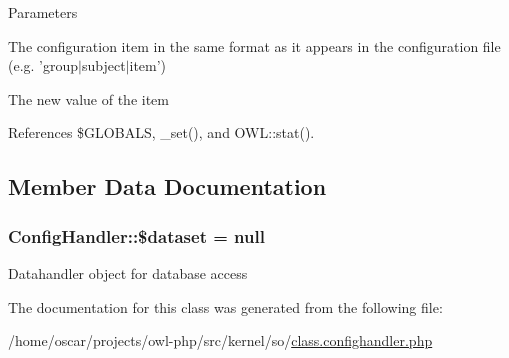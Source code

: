 \begin{DoxyParams}{Parameters}
\item[\mbox{\tt[in]} {\em \$\_\-item}]The configuration item in the same format as it appears in the configuration file (e.g. 'group$|$subject$|$item') \item[\mbox{\tt[in]} {\em \$\_\-value}]The new value of the item \end{DoxyParams}


References \$GLOBALS, \_\-set(), and OWL::stat().



\subsection{Member Data Documentation}
\subsubsection[{\$dataset}]{\setlength{\rightskip}{0pt plus 5cm}ConfigHandler::\$dataset = null}\label{classConfigHandler_a271a119ca51e0d3da5b8bc2238fc569a}
Datahandler object for database access 

The documentation for this class was generated from the following file:\begin{DoxyCompactItemize}
\item 
/home/oscar/projects/owl-\/php/src/kernel/so/\hyperlink{class_8confighandler_8php}{class.confighandler.php}\end{DoxyCompactItemize}
